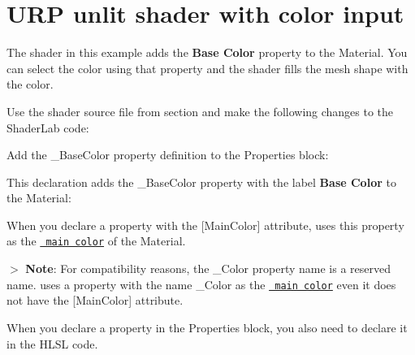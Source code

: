 \chapter{URP unlit shader with color input}
\hypertarget{md__hey_tea_9_2_library_2_package_cache_2com_8unity_8render-pipelines_8universal_0d14_80_88_2_do371daa0f53e84dc8e548070f6e70d5f1}{}\label{md__hey_tea_9_2_library_2_package_cache_2com_8unity_8render-pipelines_8universal_0d14_80_88_2_do371daa0f53e84dc8e548070f6e70d5f1}
\label{md__hey_tea_9_2_library_2_package_cache_2com_8unity_8render-pipelines_8universal_0d14_80_88_2_do371daa0f53e84dc8e548070f6e70d5f1_autotoc_md2709}%
%
 The  shader in this example adds the {\bfseries{Base Color}} property to the Material. You can select the color using that property and the shader fills the mesh shape with the color.

Use the  shader source file from section  and make the following changes to the Shader\+Lab code\+:


\begin{DoxyEnumerate}
\item Add the {\ttfamily \+\_\+\+Base\+Color} property definition to the Properties block\+:


\begin{DoxyCode}{0}
\DoxyCodeLine{++}
\DoxyCodeLine{\ \ \ \{}
\DoxyCodeLine{\ \ \ \}}

\end{DoxyCode}


This declaration adds the {\ttfamily \+\_\+\+Base\+Color} property with the label {\bfseries{Base Color}} to the Material\+:



When you declare a property with the {\ttfamily \mbox{[}Main\+Color\mbox{]}} attribute,  uses this property as the \href{https://docs.unity3d.com/ScriptReference/Material-color.html}{\texttt{ main color}} of the Material.

\texorpdfstring{$>$}{>} {\bfseries{Note}}\+: For compatibility reasons, the {\ttfamily \+\_\+\+Color} property name is a reserved name.  uses a property with the name {\ttfamily \+\_\+\+Color} as the \href{https://docs.unity3d.com/ScriptReference/Material-color.html}{\texttt{ main color}} even it does not have the {\ttfamily \mbox{[}Main\+Color\mbox{]}} attribute.
\item When you declare a property in the Properties block, you also need to declare it in the HLSL code.
\end{DoxyEnumerate}

